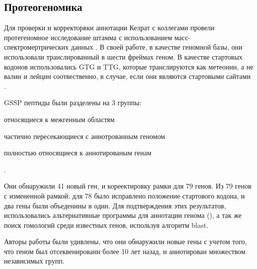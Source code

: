 \subsection{Протеогеномика }
Для проверки и корректорвки аннотации Келрат с коллегами провели протегеномное исследование штамма  с использованием масс-спектромертрических данных \cite{kelkar2011proteogenomic}. В своей работе, в качестве геномной базы, они использовали транслированный в шести фреймах геном. В качестве стартовых кодонов использовались GTG и TTG, которые транслируются как метеонин, а не валин и лейцин соотвественно, в случае, если они являются стартовыми сайтами \cite{cole1998erratum}. 

GSSP пептиды были разделены на 3 группы:
\begin{inparaenum}
    \item относящиеся к межгенным областям
    \item частично пересекающиеся с аннотрованным геномом
    \item полностью относящиеся к аннотированым генам
\end{inparaenum}.

Они обнаружили 41 новый ген, и кореектировку рамки для 79 генов. Из 79 генов с измененной рамкой: для 78 было исправлено положение стартового кодона, и два гены были объеденины в один. Для подтверждения этих результатов, использовались альтернативные программы для аннотации генома (), а так же поиск гомологий среди известных генов, используя алгоритм blast. 

Авторы работы были удивлены, что они обнаружили новые гены с учетом того, что геном был отсеквенированн более 10 лет назад, и аннотирован множеством независимых групп.





























\newpage
